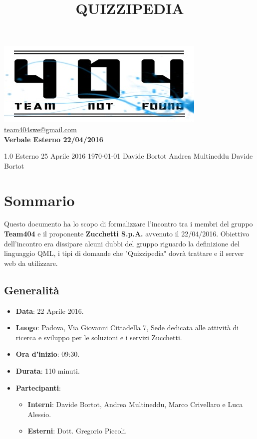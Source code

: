 \documentclass[a4paper,11pt]{article}
\title{\textbf{{\fontsize{10mm}{6mm}\selectfont QUIZZIPEDIA}}}
\begin{document}
	\maketitle
	
	\begin{center}

	\includegraphics{../../team_not_found.jpg}\\	
	\fontsize{5mm}{3mm}\url{team404swe@gmail.com}\\
	\vspace{40mm}
	\textbf{ Verbale Esterno 22/04/2016 }
	\end{center}
	\thispagestyle{empty}	%
			{1.0} 							%
			{Esterno} 						%
			{25 Aprile 2016} 				%
			{\today} 						%
			{Davide Bortot}					%
			{Andrea Multineddu} 			%
			{Davide Bortot} 				%
	
	\newpage
	\section{Sommario}
	Questo documento ha lo scopo di formalizzare l'incontro tra i membri del gruppo \textbf{Team404} e il proponente \textbf{Zucchetti S.p.A.} avvenuto il 22/04/2016. Obiettivo dell'incontro era dissipare alcuni dubbi del gruppo riguardo la definizione del linguaggio QML, i tipi di domande che "Quizzipedia" dovrà trattare e il server web da utilizzare.
	\subsection{Generalità}
	\begin{itemize}
	\item\textbf{Data}: 22 Aprile 2016.
	\item\textbf{Luogo}: Padova, Via Giovanni Cittadella 7, Sede dedicata alle attività di ricerca e sviluppo per le soluzioni e i servizi Zucchetti.
	\item\textbf{Ora d'inizio}: 09:30.
	\item\textbf{Durata}: 110 minuti.
	\item\textbf{Partecipanti}:
	\begin{itemize}
		\item\textbf{Interni}: Davide Bortot, Andrea Multineddu, Marco Crivellaro e Luca Alessio.
		\item\textbf{Esterni}: Dott. Gregorio Piccoli.
	\end{itemize}
	\end{itemize}
\end{document}
